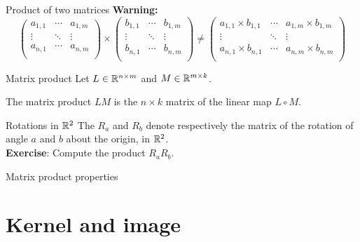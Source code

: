 \documentclass{beamer}
\begin{document}
\begin{frame}[t]{Product of two matrices}
	\textbf{Warning:}
	{\small
		$$
		\!\!\!\!\!\!\!\!\!\!\!\!
		\begin{pmatrix}
			a_{1,1}  & \cdots & a_{1,m} \\
			\vdots & \ddots & \vdots \\
			a_{n,1} & \cdots & a_{n,m} \\
		\end{pmatrix}
		\times
		\begin{pmatrix}
			b_{1,1}  & \cdots & b_{1,m} \\
			\vdots & \ddots & \vdots \\
			b_{n,1} & \cdots & b_{n,m} \\
		\end{pmatrix}
		\neq
		\begin{pmatrix}
			a_{1,1} \times b_{1,1}  & \cdots & a_{1,m} \times b_{1,m} \\
			\vdots & \ddots & \vdots \\
			a_{n,1} \times b_{n,1} & \cdots & a_{n,m} \times b_{n,m} \\
		\end{pmatrix}
		$$
	}
\end{frame}

\begin{frame}[t]{Matrix product}
	Let $L \in \mathbb{R}^{n \times m}$ and $M \in \mathbb{R}^{m \times k}$. 
	\begin{definition}
		The matrix product $LM$ is the $n \times k$ matrix of the linear map $L \circ M$.
	\end{definition}
\end{frame}
\begin{frame}[t]{Rotations in $\mathbb{R}^2$}
	The $R_{a}$ and $R_{b}$ denote respectively the matrix of the rotation of angle $a$ and $b$ about the origin, in $\mathbb{R}^2$.
	\\
	\vspace{0.3cm}
	\textbf{Exercise}:
	Compute the product $R_a R_b$.

\end{frame}
\begin{frame}[t]{Matrix product properties}
\end{frame}

\section{Kernel and image}
\end{document}
